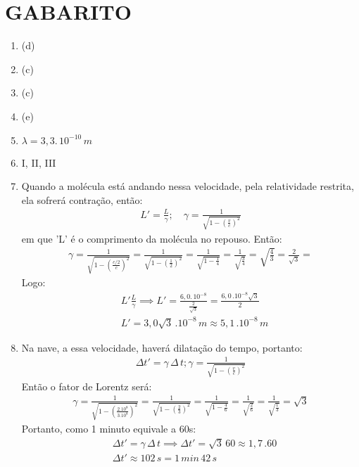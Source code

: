 \documentclass[12pt,letterpaper,fleqn]{article}
\begin{document}
\section*{GABARITO}
\begin{enumerate}
    \item (d)
    \item (c)
    \item (c) 
    \item (e)
    \item $\lambda=3,3.\,10^{-10}\,m$
    \item I, II, III
    \item Quando a molécula está andando nessa velocidade, pela relatividade restrita, ela sofrerá contração, então:
    \begin{align*}
        L'= \frac{L}{\gamma};\quad \gamma = \frac{1}{\sqrt{1-\left(\frac{v}{c}\right)^2}}
    \end{align*}
    \nonumber em que 'L' é o comprimento da molécula no repouso. Então:
    \begin{align*}
        \gamma = \frac{1}{\sqrt{1-\left(\frac{c/2}{c}\right)^2}} = \frac{1}{\sqrt{1-\left(\frac{1}{2}\right)^2}} = \frac{1}{\sqrt{1-\frac{1}{4}}} = \frac{1}{\sqrt{\frac{3}{4}}} = \sqrt{\frac{4}{3}} = \frac{2}{\sqrt{3}} = 
    \end{align*}
    Logo:
    \begin{align*}
        &L' \frac{L}{\gamma} \implies L'=\frac{6,0.\,10^{-8}}{\frac{2}{\sqrt{3}}} =\frac{6,0\,.10^{-8}\sqrt{3}}{2}\\
        &\boxed{L'= 3,0\sqrt{3}\,.10^{-8}\,m \approx 5,1\,.10^{-8}\,m}
    \end{align*}
    
    \item Na nave, a essa velocidade, haverá dilatação do tempo, portanto:
    \begin{align*}
        \Delta t'=\gamma\,\Delta\,t;\gamma =\frac{1}{\sqrt{1-\left(\frac{v}{c}\right)^2}}
    \end{align*}
    Então o fator de Lorentz será:
    \begin{align*}
        \gamma = \frac{1}{\sqrt{1-\left(\frac{2.10^8}{3.10^8}\right)^2}} = \frac{1}{\sqrt{1-\left(\frac{2}{3}\right)^2}} = \frac{1}{\sqrt{1-\frac{4}{6}}} = \frac{1}{\sqrt{\frac{2}{6}}} = \frac{1}{\sqrt{\frac{1}{3}}} = \sqrt{3}
    \end{align*}
    Portanto, como 1 minuto equivale a 60s:
    \begin{align*}
        &\Delta t'=\gamma\,\Delta\,t \implies \Delta t'= \sqrt{3}\,60 \approx 1,7\,.60\\
        &\boxed{\Delta t' \approx 102\,s = 1\,min\,42\,s}
    \end{align*}
    

\end{enumerate}
\end{document}
